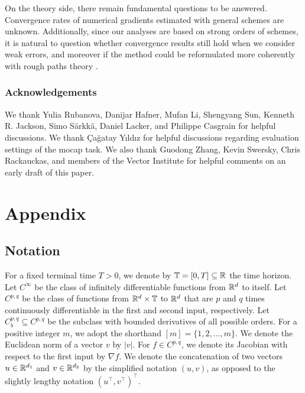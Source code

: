 \documentclass[twoside]{article}
\begin{document}
On the theory side, there remain fundamental questions to be answered. 
Convergence rates of numerical gradients estimated with general schemes are unknown.
Additionally, since our analyses are based on strong orders of schemes, it is natural to question whether convergence results still hold when we consider weak errors, and moreover if the method could be reformulated more coherently with rough paths theory \cite{lyons1998differential}.
 
\subsubsection*{Acknowledgements}
We thank Yulia Rubanova, Danijar Hafner, Mufan Li, Shengyang Sun, Kenneth R. Jackson, Simo S\"arkk\"a, Daniel Lacker, and Philippe Casgrain for helpful discussions. 
We thank Çağatay Yıldız for helpful discussions regarding evaluation settings of the mocap task. 
We also thank Guodong Zhang, Kevin Swersky, Chris Rackauckas, and members of the Vector Institute for helpful comments on an early draft of this paper. 







\newpage
\onecolumn
\section{Appendix}

\subsection{Notation} \label{app:notation}
For a fixed terminal time $T > 0$, we denote by $\mathbb{T} = [0, T] \subseteq \mathbb{R}$ the time horizon. Let 
$C^{\infty}$ be the class of infinitely differentiable functions from $\mathbb{R}^d$ to itself.
Let $C^{p, q}$ be the class of functions from $\mathbb{R}^d \times \mathbb{T}$ to $\mathbb{R}^d$ that are $p$ and $q$ times continuously differentiable in the first and second input, respectively. 
Let $C_b^{p, q} \subseteq C^{p, q}$ be the subclass with bounded derivatives of all possible orders.
For a positive integer $m$, we adopt the shorthand $[m] = \{1, 2, \dots, m\}$. 
We denote the Euclidean norm of a vector $v$ by $| v |$.
For $f \in C^{p, q}$, we denote its Jacobian with respect to the first input by $\nabla f$.
We denote the concatenation of two vectors $u \in \mathbb{R}^{d_1}$ and $v \in \mathbb{R}^{d_2}$ by the simplified notation $(u, v)$, as opposed to the slightly lengthy notation $(u^\top, v^\top)^\top$.
\end{document}

